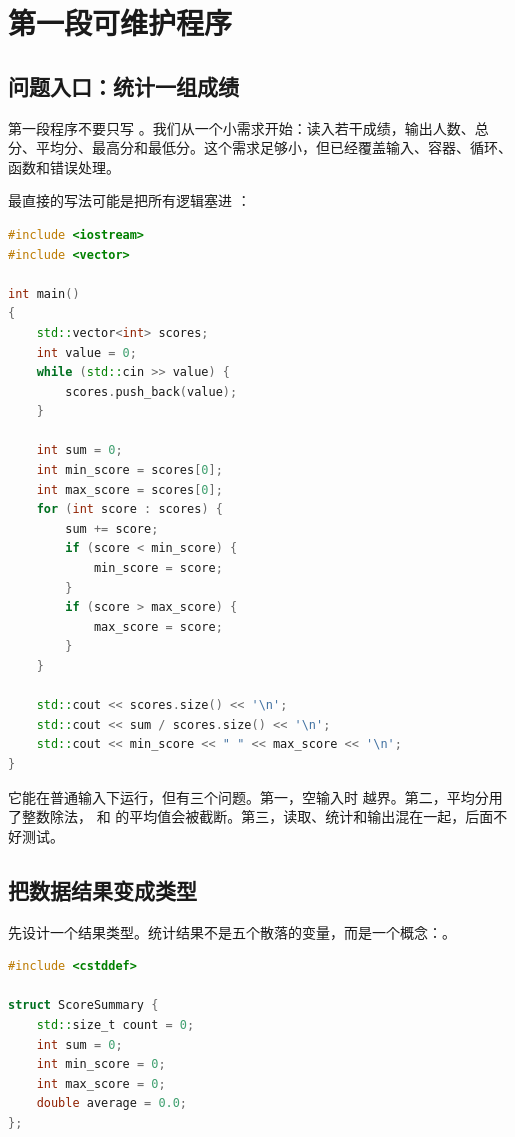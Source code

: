 \chapter{第一段可维护程序}

\section{问题入口：统计一组成绩}

第一段程序不要只写 。我们从一个小需求开始：读入若干成绩，输出人数、总分、平均分、最高分和最低分。这个需求足够小，但已经覆盖输入、容器、循环、函数和错误处理。

最直接的写法可能是把所有逻辑塞进 ：

\begin{lstlisting}[language=C++,caption={所有逻辑挤在 main 里}]
#include <iostream>
#include <vector>

int main()
{
    std::vector<int> scores;
    int value = 0;
    while (std::cin >> value) {
        scores.push_back(value);
    }

    int sum = 0;
    int min_score = scores[0];
    int max_score = scores[0];
    for (int score : scores) {
        sum += score;
        if (score < min_score) {
            min_score = score;
        }
        if (score > max_score) {
            max_score = score;
        }
    }

    std::cout << scores.size() << '\n';
    std::cout << sum / scores.size() << '\n';
    std::cout << min_score << " " << max_score << '\n';
}
\end{lstlisting}

它能在普通输入下运行，但有三个问题。第一，空输入时  越界。第二，平均分用了整数除法， 和  的平均值会被截断。第三，读取、统计和输出混在一起，后面不好测试。

\section{把数据结果变成类型}

先设计一个结果类型。统计结果不是五个散落的变量，而是一个概念：。

\begin{lstlisting}[language=C++,caption={用结构体表达统计结果}]
#include <cstddef>

struct ScoreSummary {
    std::size_t count = 0;
    int sum = 0;
    int min_score = 0;
    int max_score = 0;
    double average = 0.0;
};
\end{lstlisting}


